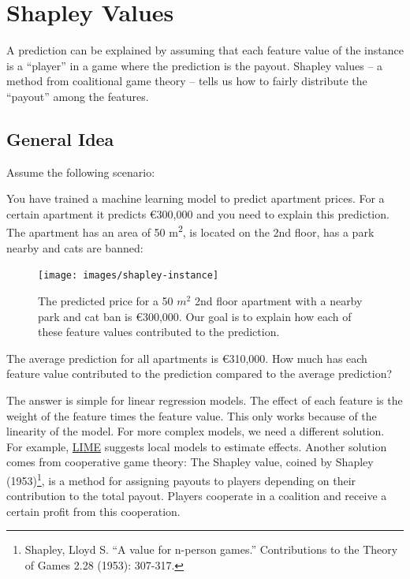 \documentclass[
  10pt,
]{scrbook}
\begin{document}
\newpage

\hypertarget{shapley}{%
\section{Shapley Values}\label{shapley}}

A prediction can be explained by assuming that each feature value of the instance is a ``player'' in a game where the prediction is the payout.
Shapley values -- a method from coalitional game theory -- tells us how to fairly distribute the ``payout'' among the features.

\hypertarget{general-idea}{%
\subsection{General Idea}\label{general-idea}}

Assume the following scenario:

You have trained a machine learning model to predict apartment prices.
For a certain apartment it predicts €300,000 and you need to explain this prediction.
The apartment has an area of 50 m\textsuperscript{2}, is located on the 2nd floor, has a park nearby and cats are banned:

\begin{figure}

{\centering \texttt{[image: images/shapley-instance]} 

}

\caption{The predicted price for a 50 $m^2$ 2nd floor apartment with a nearby park and cat ban is €300,000. Our goal is to explain how each of these feature values contributed to the prediction.}\label{fig:shapley-instance}
\end{figure}

The average prediction for all apartments is €310,000.
How much has each feature value contributed to the prediction compared to the average prediction?

The answer is simple for linear regression models.
The effect of each feature is the weight of the feature times the feature value.
This only works because of the linearity of the model.
For more complex models, we need a different solution.
For example, \protect\hyperlink{lime}{LIME} suggests local models to estimate effects.
Another solution comes from cooperative game theory:
The Shapley value, coined by Shapley (1953)\footnote{Shapley, Lloyd S. ``A value for n-person games.'' Contributions to the Theory of Games 2.28 (1953): 307-317.}, is a method for assigning payouts to players depending on their contribution to the total payout.
Players cooperate in a coalition and receive a certain profit from this cooperation.
\end{document}
